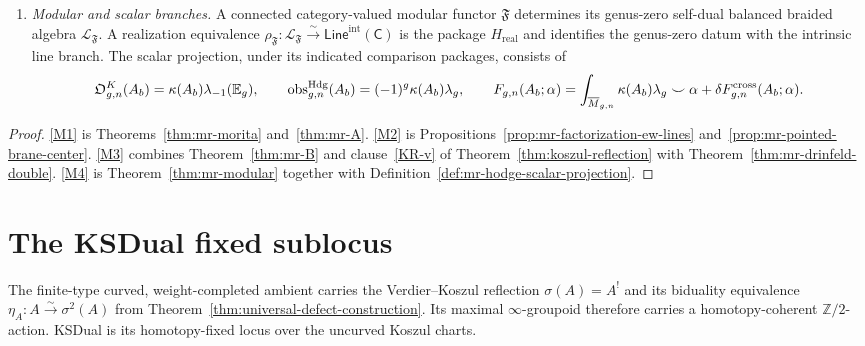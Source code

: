 \begin{theorem}
\begin{enumerate}[label=\textup{(M\arabic*)}]
with the categorical chiral center.
\item \label{M4}
\emph{Modular and scalar branches.}
A connected category-valued modular functor $\mathfrak F$ determines
its genus-zero self-dual balanced braided algebra
$\mathcal L_{\mathfrak F}$.  A realization equivalence
$\rho_{\mathfrak F}\colon\mathcal L_{\mathfrak F}\xrightarrow{\sim}
\mathsf{Line}^{\mathrm{int}}(\mathsf C)$ is the package
$H_{\mathrm{real}}$ and identifies the genus-zero datum with the
intrinsic line branch.
The scalar projection, under its indicated comparison packages,
consists of
\[
 \mathfrak O^K_{g,n}(A_b)
 =\kappa(A_b)\lambda_{-1}(\mathbb E_g),
 \qquad
 \operatorname{obs}^{\mathrm{Hdg}}_{g,n}(A_b)
 =(-1)^g\kappa(A_b)\lambda_g,
 \qquad
 F_{g,n}(A_b;\alpha)
 =\int_{\overline{M}_{g,n}}\kappa(A_b)\lambda_g\smile\alpha
 +\delta F^{\mathrm{cross}}_{g,n}(A_b;\alpha).
\]
\end{enumerate}
\end{theorem}

\begin{proof}
\ref{M1} is Theorems~\ref{thm:mr-morita} and~\ref{thm:mr-A}.
\ref{M2} is Propositions~\ref{prop:mr-factorization-ew-lines}
and~\ref{prop:mr-pointed-brane-center}.
\ref{M3} combines Theorem~\ref{thm:mr-B} and clause~\ref{KR-v} of
Theorem~\ref{thm:koszul-reflection} with
Theorem~\ref{thm:mr-drinfeld-double}.
\ref{M4} is Theorem~\ref{thm:mr-modular} together with
Definition~\ref{def:mr-hodge-scalar-projection}.
\end{proof}

\section{The KSDual fixed sublocus}
\label{sec:mr-ksdual}

The finite-type curved, weight-completed ambient carries the
Verdier--Koszul reflection $\sigma(A)=A^!$ and its biduality
equivalence $\eta_A\colon A\xrightarrow{\sim}\sigma^2(A)$ from
Theorem~\ref{thm:universal-defect-construction}.  Its maximal
$\infty$-groupoid therefore carries a homotopy-coherent
$\mathbb Z/2$-action.  KSDual is its homotopy-fixed locus over the
uncurved Koszul charts.

